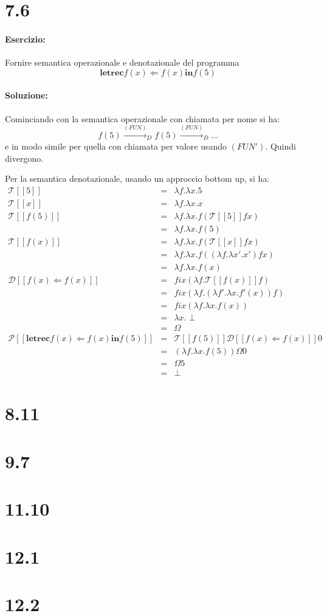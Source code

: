 \documentclass[a4paper,twosides]{report}
\begin{document}
\section*{7.6}
\paragraph{Esercizio:}
Fornire semantica operazionale e denotazionale del programma
$$
\mathbf{letrec} f(x) \Leftarrow f(x) \mathbf{in} f(5)  
$$

\paragraph{Soluzione:}
Cominciando con la semantica operazionale con chiamata per nome si ha:
$$
f(5) \xrightarrow{(FUN)}_D f(5) \xrightarrow{(FUN)}_D \dots
$$
e in modo simile per quella con chiamata per valore usando
$(FUN')$. Quindi divergono.

Per la semantica denotazionale, usando un approccio bottom up, si ha:
\begin{eqnarray*}
  \mathcal{T}[[5]]&=&\lambda f.\lambda x. 5\\
  \mathcal{T}[[x]]&=&\lambda f.\lambda x. x\\
  \mathcal{T}[[f(5)]]&=&\lambda f.\lambda x. f(\mathcal{T}[[5]]fx)\\
  &=&\lambda f.\lambda x.f(5)\\
  \mathcal{T}[[f(x)]]&=&\lambda f.\lambda x. f(\mathcal{T}[[x]]fx)\\
  &=&\lambda f.\lambda x.f((\lambda f.\lambda x'.x')fx)\\
  &=&\lambda f.\lambda x.f(x)\\
  \mathcal{D}[[f(x)\Leftarrow f(x)]]&=&fix(\lambda
  f.\mathcal{T}[[f(x)]]f)\\
  &=&fix(\lambda f.(\lambda f'.\lambda x.f'(x))f)\\
  &=&fix(\lambda f.\lambda x. f(x))\\
  &=&\lambda x.\perp\\
  &=&\Omega\\
  \mathcal{P}[[\mathbf{letrec} f(x) \Leftarrow f(x) \mathbf{in} f(5)
  ]]&=&\mathcal{T}[[f(5)]]\mathcal{D}[[f(x)\Leftarrow f(x)]]0\\
  &=&(\lambda f.\lambda x.f(5))\Omega 0\\
  &=&\Omega 5\\
  &=&\perp
\end{eqnarray*}
\section*{8.11}

\section*{9.7}

\section*{11.10}

\section*{12.1}

\section*{12.2}
 
\end{document}

